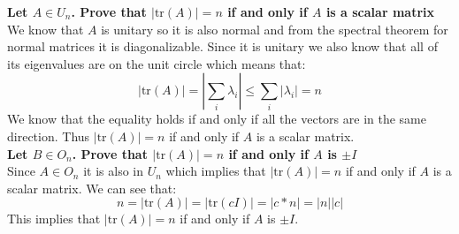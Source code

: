 \documentclass[11pt,a4paper]{article}
\theoremstyle{plain}
\newcommand{\tr}{\text{tr}}
\begin{document}
	\newpage
	\noindent
	\textbf{Let $A\in U_n$. Prove that $|\tr(A)| = n$ if and only if $A$ is
	a scalar matrix} \\
	We know that $A$ is unitary so it is also normal and from the spectral
	theorem for normal matrices it is diagonalizable. Since it is unitary
	we also know that all of its eigenvalues are on the unit circle which means
	that:
	\[
		|\tr(A)| = \left|\sum_i{\lambda_i}\right| \le \sum_i{|\lambda_i|}
		= n
	\]
	We know that the equality holds if and only if all the vectors are
	in the same direction. Thus $|\tr(A)| = n$ if and only if $A$ is a
	scalar matrix.
	\\ \noindent
	\textbf{Let $B\in O_n$. Prove that $|\tr(A)| = n$ if and only if $A$ is
	$\pm I$} \\
	Since $A\in O_n$ it is also in $U_n$ which implies that $|\tr(A)| = n$ 
	if and only if $A$ is a scalar matrix. We can see that:
	\[
		n = |\tr(A)| = |\tr(cI)| = |c*n| = |n||c|
	\]
	This implies that $|\tr(A)| = n$ if and only if $A$ is $\pm I$.
	
\end{document}
